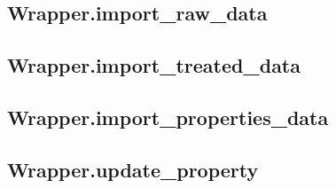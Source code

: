 \subsection{Wrapper.import\_raw\_data}\label{subchapter:wrapper.import_raw_data}


\subsection{Wrapper.import\_treated\_data}\label{subchapter:wrapper.import_treated_data}


\subsection{Wrapper.import\_properties\_data}\label{subchapter:wrapper.import_properties_data}


\subsection{Wrapper.update\_property}\label{subchapter:wrapper.update_property}
